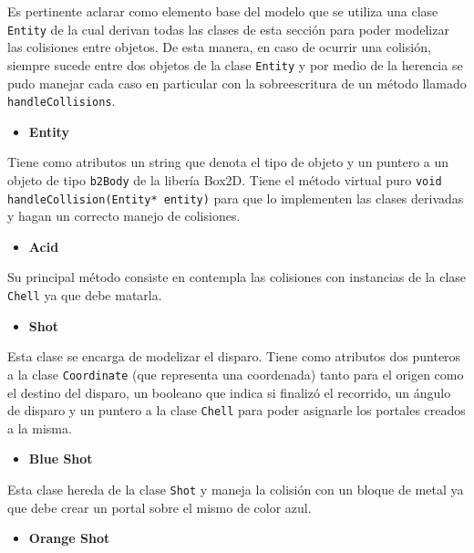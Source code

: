 \documentclass[a4paper]{article}
\begin{document}
Es pertinente aclarar como elemento base del modelo que se utiliza una clase \texttt{Entity} de la cual derivan todas las clases de esta sección para poder modelizar las colisiones entre objetos. De esta manera, en caso de ocurrir una colisión, siempre sucede entre dos objetos de la clase \texttt{Entity} y por medio de la herencia se pudo manejar cada caso en particular con la sobreescritura de un método llamado \texttt{handleCollisions}. 

\begin{itemize}
	\item \textbf{Entity}
\end{itemize}

Tiene como atributos un string que denota el tipo de objeto y un puntero a un objeto de tipo \texttt{b2Body} de la libería Box2D. Tiene el método virtual puro \texttt{void handleCollision(Entity* entity)} para que lo implementen las clases derivadas y hagan un correcto manejo de colisiones.

\begin{itemize}
	\item \textbf{Acid}
\end{itemize}

Su principal método consiste en contempla las colisiones con instancias de la clase \texttt{Chell} ya que debe matarla.

\begin{itemize}
	\item \textbf{Shot}
\end{itemize}

Esta clase se encarga de modelizar el disparo. Tiene como atributos dos punteros a la clase \texttt{Coordinate} (que representa una coordenada) tanto para el origen como el destino del disparo, un booleano que indica si finalizó el recorrido, un ángulo de disparo y un puntero a la clase \texttt{Chell} para poder asignarle los portales creados a la misma.

\begin{itemize}
	\item \textbf{Blue Shot}
\end{itemize}

Esta clase hereda de la clase \texttt{Shot} y maneja la colisión con un bloque de metal ya que debe crear un portal sobre el mismo de color azul.

\begin{itemize}
	\item \textbf{Orange Shot}
\end{itemize}
\end{document}
